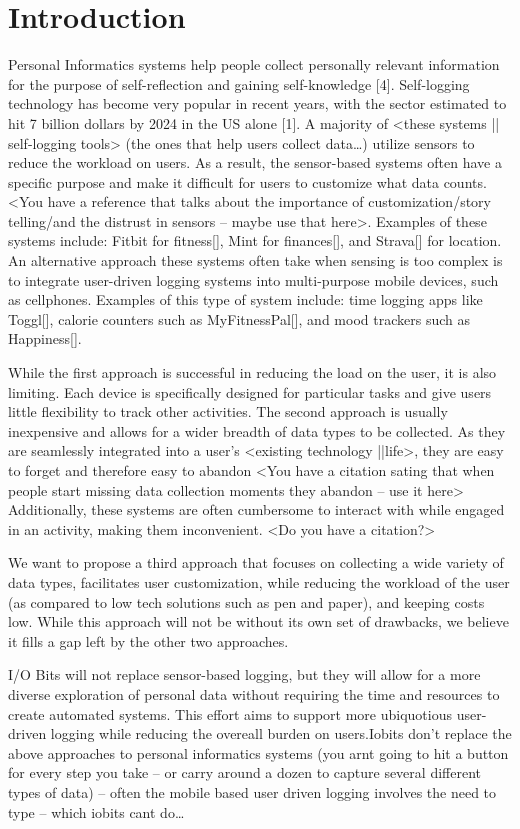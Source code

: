 \documentclass[sigchi-a, authorversion]{acmart}
\begin{document}
\section{Introduction}
Personal Informatics systems help people collect personally relevant information for the purpose of self-reflection and gaining self-knowledge [4]. Self-logging technology has become very popular in recent years, with the sector estimated to hit 7 billion dollars by 2024 in the US alone [1]. A majority of <these systems || self-logging tools> (the ones that help users collect data…) utilize sensors to reduce the workload on users. As a result, the sensor-based systems often have a specific purpose and make it difficult for users to customize what data counts. <You have a reference that talks about the importance of customization/story telling/and the distrust in sensors – maybe use that here>. Examples of these systems include: Fitbit for fitness[], Mint for finances[], and Strava[] for location. An alternative approach these systems often take when sensing is too complex is to integrate user-driven logging systems into multi-purpose mobile devices, such as cellphones. Examples of this type of system include: time logging apps like Toggl[], calorie counters such as MyFitnessPal[], and mood trackers such as Happiness[].

While the first approach is successful in reducing the load on the user, it is also limiting. Each device is specifically designed for particular tasks and give users little flexibility to track other activities. The second approach is usually inexpensive and allows for a wider breadth of data types to be collected. As they are seamlessly integrated into a user’s <existing technology ||life>, they are easy to forget and therefore easy to abandon <You have a citation sating that when people start missing data collection moments they abandon – use it here> Additionally, these systems are often cumbersome to interact with while engaged in an activity, making them inconvenient. <Do you have a citation?>

We want to propose a third approach that focuses on collecting a wide variety of data types, facilitates user customization, while reducing the workload of the user (as compared to low tech solutions such as pen and paper), and keeping costs low. While this approach will not be without its own set of drawbacks, we believe it fills a gap left by the other two approaches.

I/O Bits will not replace sensor-based logging, but they will allow for a more diverse exploration of personal data without requiring the time and resources to create automated systems. This effort aims to support more ubiquotious user-driven logging while reducing the overeall burden on users.Iobits don’t replace the above approaches to personal informatics systems (you arnt going to hit a button for every step you take – or carry around a dozen to capture several different types of data) – often the mobile based user driven logging involves the need to type – which iobits cant do…
\end{document}
